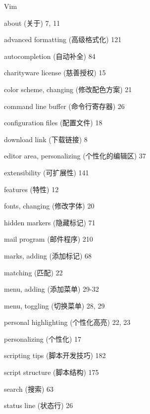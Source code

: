 \begin{multicols}{2}
\hangindent=3pc  Vim \par
\hangindent=3pc \quad about (关于) 7, 11 \par
\hangindent=3pc \quad advanced formatting (高级格式化) 121 \par
\hangindent=3pc \quad autocompletion (自动补全) 84 \par
\hangindent=3pc \quad charityware license (慈善授权) 15 \par
\hangindent=3pc \quad color scheme, changing (修改配色方案) 21 \par
\hangindent=3pc \quad command line buffer (命令行寄存器) 26 \par
\hangindent=3pc \quad configuration files (配置文件) 18 \par
\hangindent=3pc \quad download link (下载链接) 8 \par
\hangindent=3pc \quad editor area, personalizing (个性化的编辑区) 37 \par
\hangindent=3pc \quad extensibility (可扩展性) 141 \par
\hangindent=3pc \quad features (特性) 12 \par
\hangindent=3pc \quad fonts, changing (修改字体) 20 \par
\hangindent=3pc \quad hidden markers (隐藏标记) 71 \par
\hangindent=3pc \quad mail program (邮件程序) 210 \par
\hangindent=3pc \quad marks, adding (添加标记) 68 \par
\hangindent=3pc \quad matching (匹配) 22 \par
\hangindent=3pc \quad menu, adding (添加菜单) 29-32 \par
\hangindent=3pc \quad menu, toggling (切换菜单) 28, 29 \par
\hangindent=3pc \quad personal highlighting (个性化高亮) 22, 23 \par
\hangindent=3pc \quad personalizing (个性化) 17 \par
\hangindent=3pc \quad scripting tips (脚本开发技巧) 182 \par
\hangindent=3pc \quad script structure (脚本结构) 175 \par
\hangindent=3pc \quad search (搜索) 63 \par
\hangindent=3pc \quad status line (状态行) 26 \par

\end{multicols}
